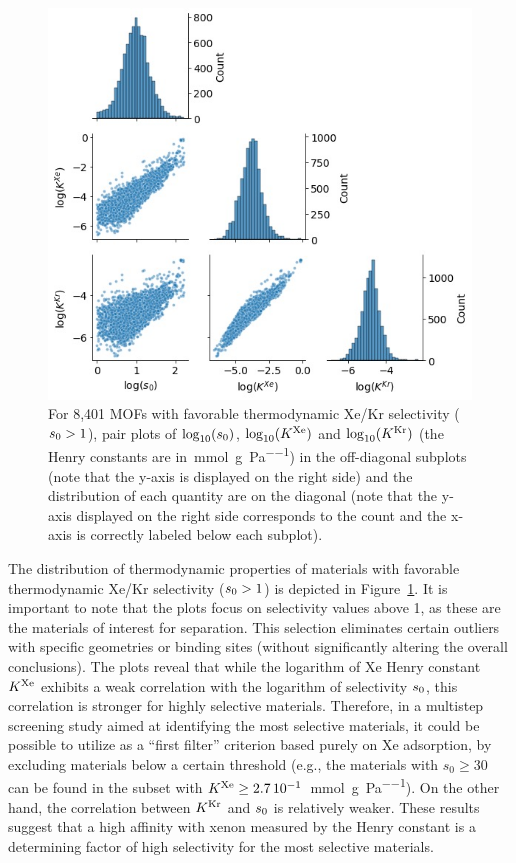 \documentclass[main.tex]{subfiles}
\begin{document}
\begin{figure}[t]
\centering
  \includegraphics[width=0.6\linewidth]{figures/2-thermo/Henry_0.jpg}
  \caption{For 8,401 MOFs with favorable thermodynamic Xe/Kr selectivity ($s_{\text{0}} > 1$), pair plots of $\log_{\text{10}}(s_{\text{0}})$, $\log_{\text{10}}(K^{\text{Xe}})$ and $\log_{\text{10}}(K^{\text{Kr}})$ (the Henry constants are in~\si{\milli\mol\per\gram\per\pascal}) in the off-diagonal subplots (note that the y-axis is displayed on the right side) and the distribution of each quantity are on the diagonal (note that the y-axis displayed on the right side corresponds to the count and the x-axis is correctly labeled below each subplot).}\label{fgr:histo_K}
\end{figure}


The distribution of thermodynamic properties of materials with favorable thermodynamic Xe/Kr selectivity ($s_{\text{0}} > 1$) is depicted in Figure~\ref{fgr:histo_K}. It is important to note that the plots focus on selectivity values above 1, as these are the materials of interest for separation. This selection eliminates certain outliers with specific geometries or binding sites (without significantly altering the overall conclusions). The plots reveal that while the logarithm of Xe Henry constant $K^{\text{Xe}}$ exhibits a weak correlation with the logarithm of selectivity $s_{\text{0}}$, this correlation is stronger for highly selective materials. Therefore, in a multistep screening study aimed at identifying the most selective materials, it could be possible to utilize as a ``first filter'' criterion based purely on Xe adsorption, by excluding materials below a certain threshold (e.g., the materials with $s_0\ge30$ can be found in the subset with $K^{\text{Xe}}\ge2.7\,10^{-1}$~\si{\milli\mol\per\gram\per\pascal}). On the other hand, the correlation between $K^{\text{Kr}}$ and $s_{\text{0}}$ is relatively weaker. These results suggest that a high affinity with xenon measured by the Henry constant is a determining factor of high selectivity for the most selective materials.  
\end{document}
